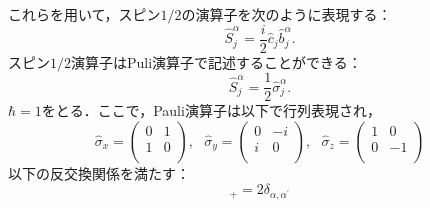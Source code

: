 \documentclass[dvipdfmx,autodetect-engine]{jsarticle}
\begin{document}
これらを用いて，スピン$1/2$の演算子を次のように表現する：
\begin{equation}\label{spin}
    \hat{S}^{\alpha}_j = \frac{i}{2} \hat{c}_j\hat{b}^{\alpha}_j.
\end{equation}
スピン$1/2$演算子はPuli演算子で記述することができる：
\begin{equation}
    \hat{S}^{\alpha}_j = \frac{1}{2}\hat{\sigma}^{\alpha}_j.
\end{equation}
$\hbar=1$をとる．ここで，Pauli演算子は以下で行列表現され，
\begin{equation}
    \hat{\sigma}_x
        =
        \left(
        \begin{array}{cc}
       0&1\\[10pt]
        1&0 \\
        \end{array}
        \right),\ \ \ 
    \hat{\sigma}_y
        =
        \left(
        \begin{array}{cc}
       0&-i\\[10pt]
        i&0 \\
        \end{array}
        \right),\ \ \ 
    \hat{\sigma}_z
        =
        \left(
        \begin{array}{cc}
       1&0\\[10pt]
        0&-1 \\
        \end{array}
        \right)
\end{equation}
以下の反交換関係を満たす：
\begin{equation}
    [\hat{\sigma}^{\alpha},\hat{\sigma}^{\alpha^\prime}]_+
    =2\delta_{\alpha,\alpha^\prime}
\end{equation}
\end{document}
